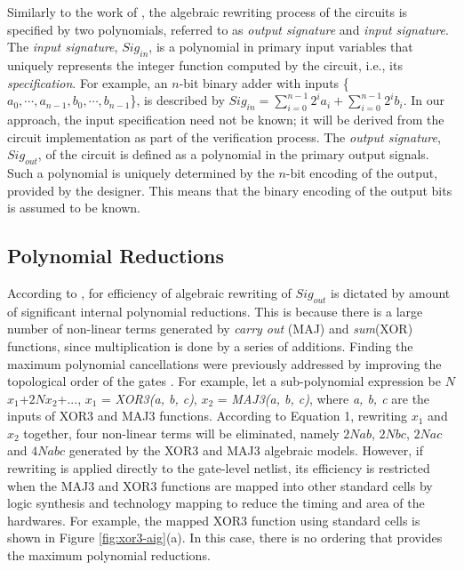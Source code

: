 Similarly to the work of \cite{ciesielski2015verification}, the algebraic rewriting process of the circuits is specified by two polynomials, referred to as {\it output signature} and {\it input signature}.
The \emph{input signature}, $Sig_{in}$, is a polynomial in primary input variables that uniquely represents the integer function computed by the circuit, i.e., its {\it specification}. For example, an $n$-bit binary adder with inputs \{$a_0,\cdots,a_{n-1},b_0,\cdots,b_{n-1}$\}, is described by $Sig_{in} = \sum _{i=0} ^{n-1} 2^i a_i + \sum _{i=0} ^{n-1} 2^i b_i$. 
In our approach, the input specification need not be known; it will be derived from the circuit implementation as part of the verification process. The \emph{output signature}, $Sig_{out}$, of the circuit is defined as a polynomial in the primary output signals. Such a polynomial is uniquely determined by the $n$-bit encoding of the output, provided by the designer. This means that the binary encoding of the output bits is assumed to be known. 

\subsection{Polynomial Reductions}

According to \cite{yu:2016-tcad-verification}, for efficiency of algebraic rewriting of $Sig_{out}$ is dictated by amount of significant internal polynomial reductions. This is because there is a large number of non-linear terms generated by \textit{carry out} (MAJ) and \textit{sum}(XOR) functions, since multiplication is done by a series of additions. Finding the maximum polynomial cancellations were previously addressed by improving the topological order of the gates \cite{yu:2016-tcad-verification}. For example, let a sub-polynomial expression be $N$$x_1$+$2N$$x_2$+..., $x_1$ = \textit{XOR3(a, b, c)}, $x_2$ = \textit{MAJ3(a, b, c)}, where \textit{a, b, c} are the inputs of XOR3 and MAJ3 functions. According to Equation 1, rewriting $x_1$ and $x_2$ together, four non-linear terms will be eliminated, namely $2N$$ab$, $2N$$bc$, $2N$$ac$ and $4N$$abc$ generated by the XOR3 and MAJ3 algebraic models. However, if rewriting is applied directly to the gate-level netlist, its efficiency is restricted when the MAJ3 and XOR3 functions are mapped into other standard cells by logic synthesis and technology mapping to reduce the timing and area of the hardwares. For example, the mapped XOR3 function using standard cells is shown in Figure \ref{fig:xor3-aig}(a). In this case, there is no ordering that provides the maximum polynomial reductions. 




